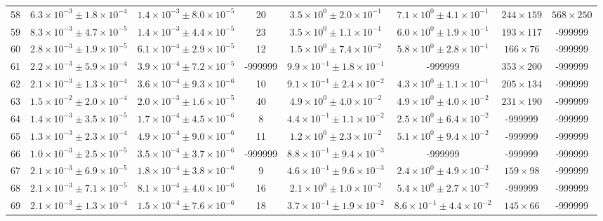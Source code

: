 \begin{table}
\begin{tabular}{cccccccc}
58 & $6.3\times10^{-3}\pm 1.8\times10^{-4}$ & $1.4\times10^{-3}\pm 8.0\times10^{-5}$ & 20 & $3.5\times10^{0}\pm 2.0\times10^{-1}$ & $7.1\times10^{0}\pm 4.1\times10^{-1}$ & $244\times 159$ & $568\times 250$ \\
59 & $8.3\times10^{-3}\pm 4.7\times10^{-5}$ & $1.4\times10^{-3}\pm 4.4\times10^{-5}$ & 23 & $3.5\times10^{0}\pm 1.1\times10^{-1}$ & $6.0\times10^{0}\pm 1.9\times10^{-1}$ & $193\times 117$ & -999999 \\
60 & $2.8\times10^{-3}\pm 1.9\times10^{-5}$ & $6.1\times10^{-4}\pm 2.9\times10^{-5}$ & 12 & $1.5\times10^{0}\pm 7.4\times10^{-2}$ & $5.8\times10^{0}\pm 2.8\times10^{-1}$ & $166\times 76$ & -999999 \\
61 & $2.2\times10^{-3}\pm 5.9\times10^{-4}$ & $3.9\times10^{-4}\pm 7.2\times10^{-5}$ & -999999 & $9.9\times10^{-1}\pm 1.8\times10^{-1}$ & -999999 & $353\times 200$ & -999999 \\
62 & $2.1\times10^{-3}\pm 1.3\times10^{-4}$ & $3.6\times10^{-4}\pm 9.3\times10^{-6}$ & 10 & $9.1\times10^{-1}\pm 2.4\times10^{-2}$ & $4.3\times10^{0}\pm 1.1\times10^{-1}$ & $205\times 134$ & -999999 \\
63 & $1.5\times10^{-2}\pm 2.0\times10^{-4}$ & $2.0\times10^{-3}\pm 1.6\times10^{-5}$ & 40 & $4.9\times10^{0}\pm 4.0\times10^{-2}$ & $4.9\times10^{0}\pm 4.0\times10^{-2}$ & $231\times 190$ & -999999 \\
64 & $1.4\times10^{-3}\pm 3.5\times10^{-5}$ & $1.7\times10^{-4}\pm 4.5\times10^{-6}$ & 8 & $4.4\times10^{-1}\pm 1.1\times10^{-2}$ & $2.5\times10^{0}\pm 6.4\times10^{-2}$ & -999999 & -999999 \\
65 & $1.3\times10^{-3}\pm 2.3\times10^{-4}$ & $4.9\times10^{-4}\pm 9.0\times10^{-6}$ & 11 & $1.2\times10^{0}\pm 2.3\times10^{-2}$ & $5.1\times10^{0}\pm 9.4\times10^{-2}$ & -999999 & -999999 \\
66 & $1.0\times10^{-3}\pm 2.5\times10^{-5}$ & $3.5\times10^{-4}\pm 3.7\times10^{-6}$ & -999999 & $8.8\times10^{-1}\pm 9.4\times10^{-3}$ & -999999 & -999999 & -999999 \\
67 & $2.1\times10^{-3}\pm 6.9\times10^{-5}$ & $1.8\times10^{-4}\pm 3.8\times10^{-6}$ & 9 & $4.6\times10^{-1}\pm 9.6\times10^{-3}$ & $2.4\times10^{0}\pm 4.9\times10^{-2}$ & $159\times 98$ & -999999 \\
68 & $2.1\times10^{-3}\pm 7.1\times10^{-5}$ & $8.1\times10^{-4}\pm 4.0\times10^{-6}$ & 16 & $2.1\times10^{0}\pm 1.0\times10^{-2}$ & $5.4\times10^{0}\pm 2.7\times10^{-2}$ & -999999 & -999999 \\
69 & $2.1\times10^{-3}\pm 1.3\times10^{-4}$ & $1.5\times10^{-4}\pm 7.6\times10^{-6}$ & 18 & $3.7\times10^{-1}\pm 1.9\times10^{-2}$ & $8.6\times10^{-1}\pm 4.4\times10^{-2}$ & $145\times 66$ & -999999 \\

\end{tabular}
\end{table}
